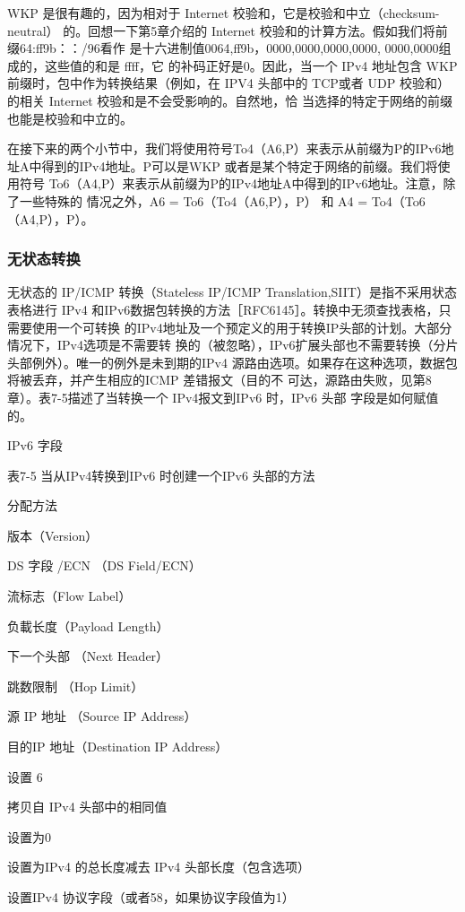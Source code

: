 WKP 是很有趣的，因为相对于 Internet 校验和，它是校验和中立（checksum-neutral）
的。回想一下第5章介绍的 Internet 校验和的计算方法。假如我们将前缀64:ff9b：：/96看作
是十六进制值0064,ff9b，0000,0000,0000,0000, 0000,0000组成的，这些值的和是 ffff，它
的补码正好是0。因此，当一个 IPv4 地址包含 WKP 前缀时，包中作为转换结果（例如，在
IPV4 头部中的 TCP或者 UDP 校验和）的相关 Internet 校验和是不会受影响的。自然地，恰
当选择的特定于网络的前缀也能是校验和中立的。

在接下来的两个小节中，我们将使用符号To4（A6,P）来表示从前缀为P的IPv6地
址A中得到的IPv4地址。P可以是WKP 或者是某个特定于网络的前缀。我们将使用符号
To6（A4,P）来表示从前缀为P的IPv4地址A中得到的IPv6地址。注意，除了一些特殊的
情况之外，A6 = To6（To4（A6,P），P） 和 A4 = To4（To6（A4,P），P）。

\subsubsection{无状态转换}

无状态的 IP/ICMP 转换（Stateless IP/ICMP Translation,SIIT）是指不采用状态表格进行
IPv4 和IPv6数据包转换的方法［RFC6145］。转换中无须查找表格，只需要使用一个可转换
的IPv4地址及一个预定义的用于转换IP头部的计划。大部分情况下，IPv4选项是不需要转
换的（被忽略），IPv6扩展头部也不需要转换（分片头部例外）。唯一的例外是未到期的IPv4
源路由选项。如果存在这种选项，数据包将被丢弃，并产生相应的ICMP 差错报文（目的不
可达，源路由失败，见第8章）。表7-5描述了当转换一个 IPv4报文到IPv6 时，IPv6 头部
字段是如何赋值的。

IPv6 字段

表7-5 当从IPv4转换到IPv6 时创建一个IPv6 头部的方法

分配方法

版本（Version）

DS 字段 /ECN （DS Field/ECN）

流标志（Flow Label）

负載长度（Payload Length）

下一个头部 （Next Header）

跳数限制 （Hop Limit）

源 IP 地址 （Source IP Address）

目的IP 地址（Destination IP Address）

设置 6

拷贝自 IPv4 头部中的相同值

设置为0

设置为IPv4 的总长度减去 IPv4 头部长度（包含选项）

设置IPv4 协议字段（或者58，如果协议字段值为1）

